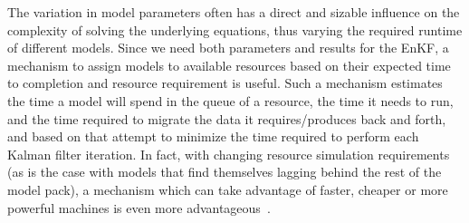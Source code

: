 \documentclass{llncs}
\begin{document}
The variation in model parameters often has a direct and sizable
influence on the complexity of solving the underlying equations, thus
varying the required runtime of different models.  
Since we need both parameters and results for the
EnKF, a mechanism to assign models to available resources based on
their expected time to completion and resource requirement is useful.
Such a mechanism estimates the time a model will spend in the queue of
a resource, the time it needs to run, and the time required to migrate
the data it requires/produces back and forth, and based on that
attempt to minimize the time required to perform each Kalman filter
iteration.  In fact, with changing resource simulation requirements
(as is the case with models that find themselves lagging behind the
rest of the model pack), a mechanism which can take advantage of
faster, cheaper or more powerful machines is even more
advantageous~\cite{escience07}.
\end{document}

